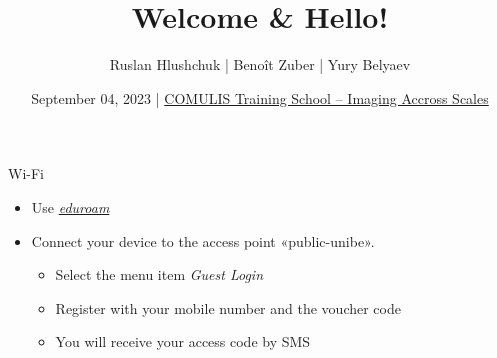 \documentclass[aspectratio=169]{beamer}
\title{Welcome \& Hello!}
\author{Ruslan Hlushchuk | Benoît Zuber | Yury Belyaev}
\institute{Institute of Anatomy\\University of Bern\\Switzerland}
\date{September 04, 2023 | \href{https://ilias.unibe.ch/goto_ilias3_unibe_crs_1589464.html}{COMULIS Training School -- Imaging Accross Scales}}
\begin{document}
{%
	\begin{frame}%
		\maketitle
	\end{frame}%
}

\begin{frame}{Wi-Fi}
	\begin{itemize}
		\item Use \emph{\href{https://www.eduroam.org/}{eduroam}}
		\item Connect your device to the access point «public-unibe».
		\begin{itemize}
			\item Select the menu item \emph{Guest Login}
			\item Register with your mobile number and the voucher code
			\begin{tcolorbox}[width=3.3cm,colframe=ubRed,colback=ubGrey,halign=center,halign title=center,title=Voucher code]
				
			\end{tcolorbox}
			\item You will receive your access code by SMS
		\end{itemize}
	\end{itemize}
\end{frame}
\end{document}

